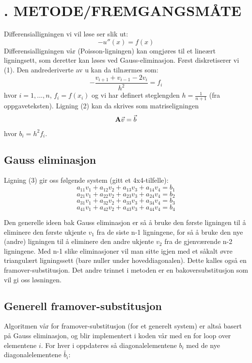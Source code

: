 \documentclass[twocolumn]{article}
\begin{document}
\section*{. METODE/FREMGANGSMÅTE}
Differensialligningen vi vil løse ser slik ut:
\begin{equation}
-u''(x) = f(x)
\end{equation}
Differensialligningen vår (Poisson-ligningen) kan omgjøres til et lineært ligningsett, som deretter kan løses ved Gauss-eliminasjon.
Først diskretiserer vi (1). Den andrederiverte av u kan da tilnærmes som:
\begin{equation}
-\frac{v_{i+1} + v_{i-1} - 2v_i} {h^2} = f_i
\end{equation}
hvor $i = 1, ..., n$, $f_i = f(x_i)$ og vi har definert steglengden $h = \frac{1}{n+1}$ (fra oppgaveteksten).
Ligning (2) kan da skrives som matriseligningen
\begin{equation}
\bold{A}\vec{v} = \vec{b}
\end{equation}
hvor $b_i = h^2 f_i$.
\subsection*{Gauss eliminasjon}
Ligning (3) gir oss følgende system (gitt et 4x4-tilfelle):
$$a_{11}v_1 + a_{12}v_2 + a_{13}v_3 + a_{14}v_4 =b_1$$
$$a_{21}v_1 + a_{22}v_2 + a_{23}v_3 + a_{24}v_4 =b_2$$
$$a_{31}v_1 + a_{32}v_2 + a_{33}v_3 + a_{34}v_4 =b_3$$
$$a_{41}v_1 + a_{42}v_2 + a_{43}v_3 + a_{44}v_4 =b_4$$

Den generelle ideen bak Gauss eliminasjon er så å bruke den første ligningen til å eliminere den første ukjente $v_1$ fra de siste n-1 ligningene, for så å bruke den nye (andre) ligningen til å eliminere den andre ukjente $v_2$ fra de gjenværende n-2 ligningene. Med n-1 slike eliminasjoner vil man sitte igjen med et såkalt øvre triangulært ligningssett (bare nuller under hoveddiagonalen). Dette kalles også en framover-substitusjon. Det andre trinnet i metoden er en bakoversubstitusjon som vil gi oss løsningen.

\subsection*{Generell framover-substitusjon}
Algoritmen vår for framover-substitusjon (for et generelt system) er altså basert på Gauss eliminasjon, og blir implementert i koden vår med en for loop over elementene $i$. For hver i oppdateres så diagonalelementene $b_i$ med de nye diagonalelementene $\tilde{b_i}$:
\end{document}
